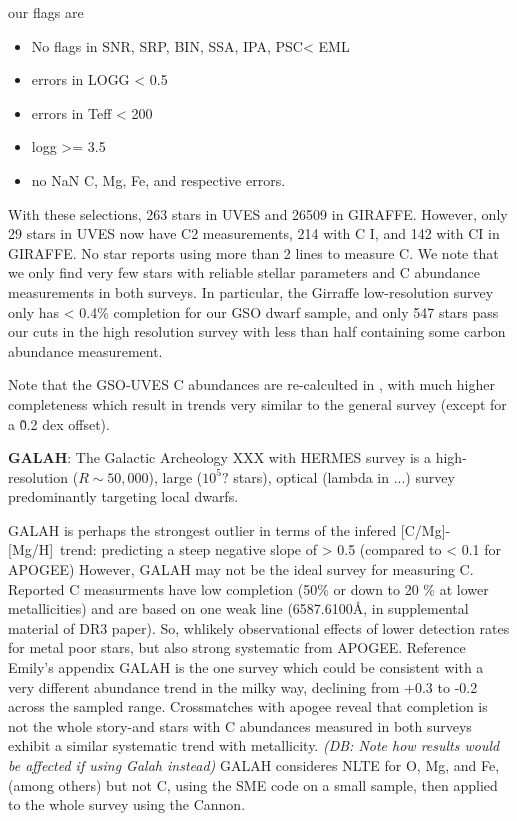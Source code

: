 \documentclass[11pt]{article}
\newcommand{\caah}{[C/Mg]-[Mg/H]}
\newcommand{\dbnote}[1]{ {\color{Thistle} \textit{\small (DB: #1)}} }
\begin{document}
our flags are
\begin{itemize}
    \item No flags in SNR, SRP, BIN, SSA, IPA, PSC< EML
    \item errors in LOGG < 0.5
    \item errors in Teff < 200
    \item logg >= 3.5
    \item no NaN C, Mg, Fe, and respective errors.
\end{itemize}

With these selections, 263 stars in UVES and 26509 in GIRAFFE. However, only 29 stars in UVES now have C2 measurements, 214 with C I, and 142 with CI in GIRAFFE. No star reports using more than 2 lines to measure C.
We note that we only find very few stars with reliable stellar parameters and C abundance measurements in both surveys. In particular, the Girraffe low-resolution survey only has < 0.4\% completion for our GSO dwarf sample, and only 547 stars pass our cuts in the high resolution survey with less than half containing some carbon abundance measurement.

Note that the GSO-UVES C abundances are re-calculted in \citet{franchini+20}, with much higher completeness
which result in trends very similar to the general survey (except for a \~ 0.2 dex offset).


\textbf{GALAH}: 
The Galactic Archeology XXX with HERMES survey \citep{DeSilva2015, Martell2017}
is a high-resolution ($R\sim 50,000$), large ($10^5?$ stars), optical (lambda in ...) survey predominantly targeting local dwarfs.

GALAH is perhaps the strongest outlier in terms of the infered \caah\ trend: predicting a steep negative slope of > 0.5 (compared to < 0.1 for APOGEE)
However, GALAH may not be the ideal survey for measuring C. Reported C measurments have low completion (50\% or down to 20 \% at lower metallicities) and are based on one weak line (6587.6100Å, in supplemental material of DR3 paper).
So, whlikely observational effects of lower detection rates for metal poor stars, but also strong systematic from APOGEE. Reference Emily's appendix
GALAH is the one survey which could be consistent with a very different abundance trend in the milky way, declining from +0.3 to -0.2 across the sampled range. 
Crossmatches with apogee reveal that completion is not the whole story-and stars with C abundances measured in both surveys exhibit a similar systematic trend with metallicity. 
\dbnote{Note how results would be affected if using Galah instead}
GALAH consideres NLTE for O, Mg, and Fe, (among others) but not C, using the SME code on a small sample, then applied to the whole survey using the Cannon.
\end{document}
